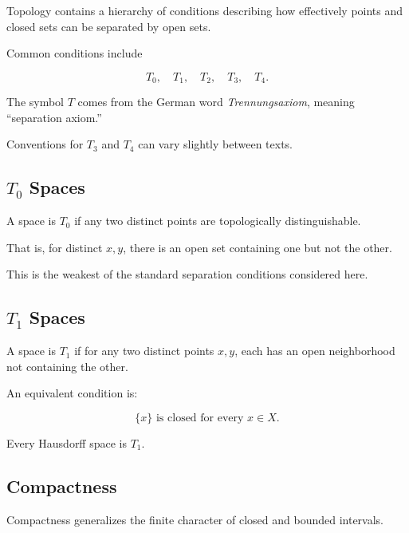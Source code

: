 Topology contains a hierarchy of conditions describing how effectively
points and closed sets can be separated by open sets.

Common conditions include

\[
\boxed{
T_0,
\quad
T_1,
\quad
T_2,
\quad
T_3,
\quad
T_4.
}
\]

The symbol \(T\) comes from the German word \emph{Trennungsaxiom}, meaning
``separation axiom.''

Conventions for \(T_3\) and \(T_4\) can vary slightly between texts.

\subsection{\texorpdfstring{\(T_0\)}{T0} Spaces}
\label{subsec:t0-spaces}

A space is \(T_0\) if any two distinct points are topologically
distinguishable.

That is, for distinct \(x,y\), there is an open set containing one but not
the other.

This is the weakest of the standard separation conditions considered here.

\subsection{\texorpdfstring{\(T_1\)}{T1} Spaces}
\label{subsec:t1-spaces}

A space is \(T_1\) if for any two distinct points \(x,y\), each has an open
neighborhood not containing the other.

An equivalent condition is:

\[
\boxed{
\{x\}\text{ is closed for every }x\in X.
}
\]

Every Hausdorff space is \(T_1\).

\subsection{Compactness}
\label{subsec:topological-compactness}

Compactness generalizes the finite character of closed and bounded intervals.

